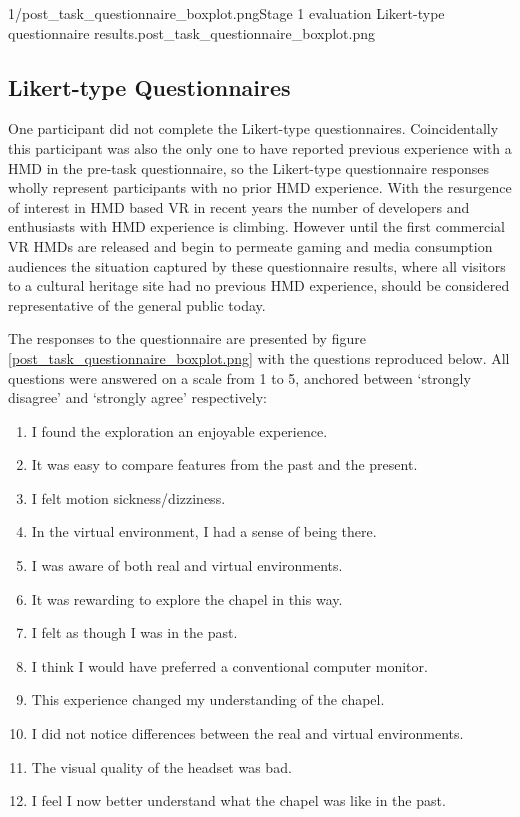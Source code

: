        {1/post_task_questionnaire_boxplot.png}{Stage 1 evaluation Likert-type questionnaire results.}{post_task_questionnaire_boxplot.png}


\subsection{Likert-type Questionnaires}

One participant did not complete the Likert-type questionnaires. Coincidentally this participant was also the only one to have reported previous experience with a HMD in the pre-task questionnaire, so the Likert-type questionnaire responses wholly represent participants with no prior HMD experience. With the resurgence of interest in HMD based VR in recent years the number of developers and enthusiasts with HMD experience is climbing. However until the first commercial VR HMDs are released and begin to permeate gaming and media consumption audiences the situation captured by these questionnaire results, where all visitors to a cultural heritage site had no previous HMD experience, should be considered representative of the general public today.

The responses to the questionnaire are presented by figure \ref{post_task_questionnaire_boxplot.png} with the questions reproduced below. All questions were answered on a scale from 1 to 5, anchored between `strongly disagree' and `strongly agree' respectively:
\begin{enumerate}
	\item I found the exploration an enjoyable experience.
	\item It was easy to compare features from the past and the present.
	\item I felt motion sickness/dizziness.
	\item In the virtual environment, I had a sense of being there.
	\item I was aware of both real and virtual environments.
	\item It was rewarding to explore the chapel in this way.
	\item I felt as though I was in the past.
	\item I think I would have preferred a conventional computer monitor.
	\item This experience changed my understanding of the chapel.
	\item I did not notice differences between the real and virtual environments.
	\item The visual quality of the headset was bad.
	\item I feel I now better understand what the chapel was like in the past.
\end{enumerate}

